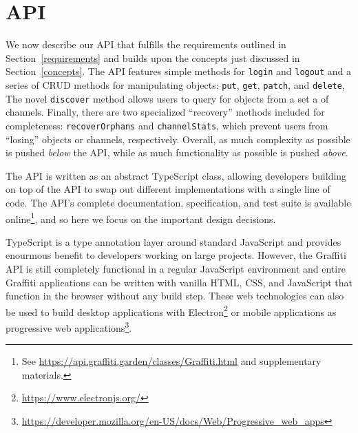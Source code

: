 \section{API}
\label{api}

We now describe our API that fulfills the requirements
outlined in Section~\ref{requirements} and builds upon the concepts
just discussed in Section~\ref{concepts}.
The API features simple methods for \texttt{login} and \texttt{logout}
and a series of CRUD methods for manipulating objects:
\texttt{put}, \texttt{get}, \texttt{patch}, and \texttt{delete},
The novel \texttt{discover} method allows users to query for objects
from a set a of channels.
Finally, there are two specialized ``recovery'' methods included for completeness:
\texttt{recoverOrphans} and \texttt{channelStats},
which prevent users from ``losing'' objects or channels, respectively.
Overall, as much complexity as possible is pushed \emph{below} the API,
while as much functionality as possible is pushed \emph{above}.

The API is written as an abstract TypeScript class, allowing
developers building on top of the API to swap out different implementations
with a single line of code.
The API's complete documentation, specification, and test suite is available online\footnote{
    See \url{https://api.graffiti.garden/classes/Graffiti.html} and supplementary materials.
}, and so here we focus on the important design decisions.

TypeScript is a type annotation layer around standard JavaScript
and provides enourmous benefit to developers working on large projects.
However, the Graffiti API is still completely functional
in a regular JavaScript environment and entire Graffiti applications can be written
with vanilla HTML, CSS, and JavaScript that function in the browser without
any build step.
These web technologies can also be used to build desktop applications
with Electron\footnote{
    \url{https://www.electronjs.org/}
} or mobile applications as progressive web applications\footnote{
    \url{https://developer.mozilla.org/en-US/docs/Web/Progressive_web_apps}
}.


